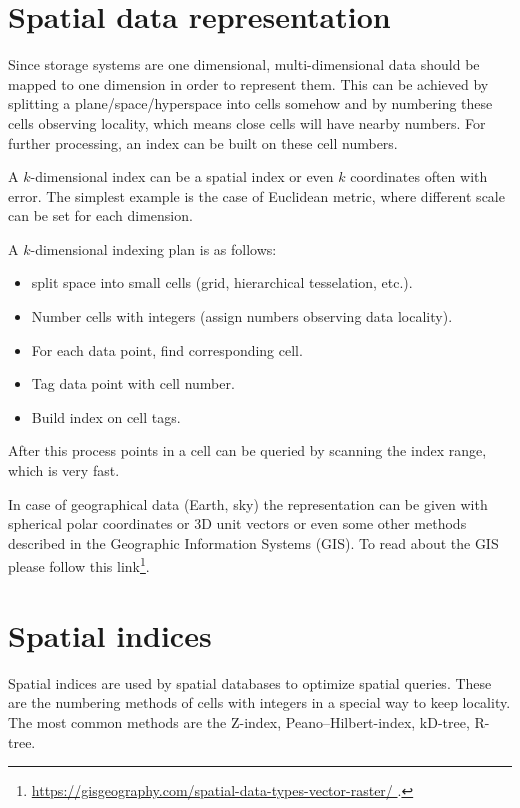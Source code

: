 \documentclass[12pt]{article}
\theoremstyle{plain}
\begin{document}
\section{Spatial data representation}

Since storage systems are one dimensional, multi-dimensional data should be mapped to one dimension in order to represent them. This can be achieved by splitting a plane/space/hyperspace into cells somehow and by numbering these cells observing locality, which means close cells will have nearby numbers. For further processing, an index can be built on these cell numbers. 

A $k$-dimensional index can be a spatial index or even $k$ coordinates often with error. The simplest example is the case of Euclidean metric, where different scale can be set for each dimension.

\pagebreak

A $k$-dimensional indexing plan is as follows:

\begin{itemize}
	\item split space into small cells (grid, hierarchical tesselation, etc.).
	\item Number cells with integers (assign numbers observing data locality).
	\item For each data point, find corresponding cell.
	\item Tag data point with cell number.
	\item Build index on cell tags.
\end{itemize}

After this process points in a cell can be queried by scanning the index range, which is very fast.

In case of geographical data (Earth, sky) the representation can be given with spherical polar coordinates or 3D unit vectors or even some other methods described in the Geographic Information Systems (GIS). To read about the GIS please follow this link\footnote{\url{https://gisgeography.com/spatial-data-types-vector-raster/
}.}.

\section{Spatial indices}

Spatial indices are used by spatial databases to optimize spatial queries. These are the numbering methods of cells with integers in a special way to keep locality. The most common methods are the Z-index, Peano–Hilbert-index, kD-tree, R-tree.
\end{document}
